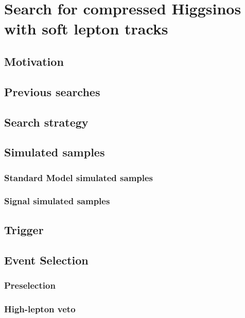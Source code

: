 \chapter{Search for compressed Higgsinos  with soft
lepton tracks}

\section{Motivation}

\section{Previous searches}



\clearpage
\section{Search strategy}
\label{sec:search-strategy}

\section{Simulated samples}
\subsection{Standard Model simulated samples}
\label{sec:sm-mc}
\subsection{Signal simulated samples}




\section{Trigger}
\label{sec:trigger}

\section{Event Selection}

\subsection{Preselection}
\subsection{High-\pt lepton veto}
